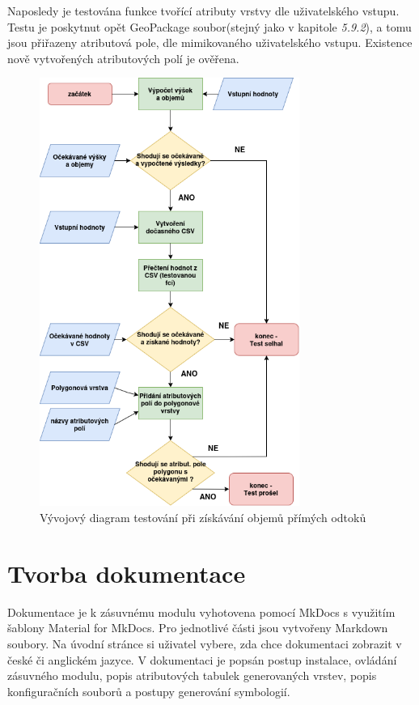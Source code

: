 \documentclass[a4paper,oneside,12pt]{book}
\begin{document}
\hspace{10mm} Naposledy je testována funkce tvořící atributy vrstvy dle uživatelského vstupu. Testu je poskytnut opět GeoPackage soubor(stejný jako v kapitole \textit{5.9.2}), a tomu jsou přiřazeny atributová pole, dle mimikovaného uživatelského vstupu. Existence nově vytvořených atributových polí je ověřena.

\begin{figure}[H] \label{obr22}
\centering
\includegraphics[height=14cm]{pictures/test5.png}
\caption{Vývojový diagram testování při získávání objemů přímých odtoků}
\label{fig:test5}
\end{figure}

\section{Tvorba dokumentace} \label{docs}

\hspace{10mm} Dokumentace je k zásuvnému modulu vyhotovena pomocí MkDocs s využitím šablony 
Material for MkDocs. Pro jednotlivé části jsou vytvořeny Markdown soubory. Na úvodní stránce si uživatel vybere, zda chce dokumentaci zobrazit v české či anglickém jazyce. V dokumentaci je popsán postup instalace, ovládání zásuvného modulu, popis atributových tabulek generovaných vrstev, popis konfiguračních souborů a postupy generování symbologií.
\end{document}
